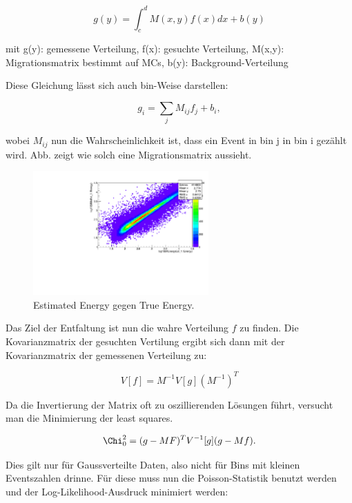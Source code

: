 \begin{equation}
 g(y)= \int_c^d M(x,y) f(x) dx + b(y)
\end{equation}

mit g(y): gemessene Verteilung, f(x): gesuchte Verteilung, M(x,y): Migrationsmatrix bestimmt auf MCs, b(y): Background-Verteilung

Diese Gleichung lässt sich auch bin-Weise darstellen:

\begin{equation}
 g_i=\sum_j M_{ij}f_j+b_i,
\end{equation}

wobei $M_{ij}$ nun die Wahrscheinlichkeit ist, dass ein Event in bin j in bin i gezählt wird.
Abb. zeigt wie solch eine Migrationsmatrix aussieht.

\begin{figure}
    \centering
    \includegraphics[width=0.6\textwidth]{./Plots/EnergyEst_EnergyTrue.pdf}
    \caption{Estimated Energy gegen True Energy.}
    \label{EnergyEst_EnergyTrue}
\end{figure}


Das Ziel der Entfaltung ist nun die wahre Verteilung $f$ zu finden.
Die Kovarianzmatrix der gesuchten Vertilung ergibt sich dann mit der Kovarianzmatrix der gemessenen Verteilung zu:

\begin{equation}
 V[f]=M^{-1}V[g](M^{-1})^T
\end{equation}

Da die Invertierung der Matrix oft zu oszillierenden Lösungen führt, versucht man die Minimierung der least squares.

\begin{equation}
 \Chi_0^2=(g-MF)^T V^{-1}[g](g-Mf).
\end{equation}

Dies gilt nur für Gaussverteilte Daten, also nicht für Bins mit kleinen Eventszahlen drinne.
Für diese muss nun die Poisson-Statistik benutzt werden und der Log-Likelihood-Ausdruck minimiert werden:

